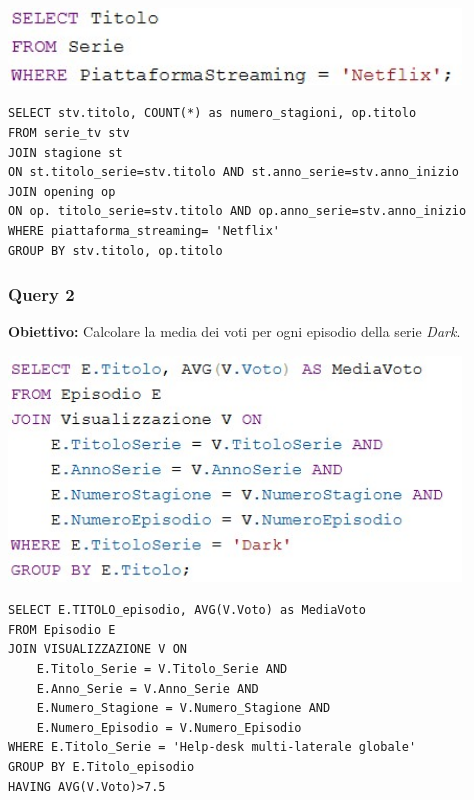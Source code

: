 \documentclass[12pt,a4paper]{article}
\begin{document}
\vspace{0.5cm}
\begin{center}
\includegraphics[width=0.9\textwidth]{Query1.jpg}
\end{center}


\begin{lstlisting}[caption={Esempio di query SQL}, label={lst:sql-example}]
SELECT stv.titolo, COUNT(*) as numero_stagioni, op.titolo
FROM serie_tv stv
JOIN stagione st
ON st.titolo_serie=stv.titolo AND st.anno_serie=stv.anno_inizio
JOIN opening op
ON op. titolo_serie=stv.titolo AND op.anno_serie=stv.anno_inizio
WHERE piattaforma_streaming= 'Netflix'
GROUP BY stv.titolo, op.titolo
\end{lstlisting}

\vspace{1cm}

\subsubsection*{Query 2 }
\textbf{Obiettivo:} Calcolare la media dei voti per ogni episodio della serie \textit{Dark}.

\vspace{0.5cm}
\begin{center}
\includegraphics[width=0.9\textwidth]{Query2.jpg}
\end{center}

\begin{lstlisting}[caption={Esempio di query SQL}, label={lst:sql-example}]
SELECT E.TITOLO_episodio, AVG(V.Voto) as MediaVoto
FROM Episodio E
JOIN VISUALIZZAZIONE V ON
	E.Titolo_Serie = V.Titolo_Serie AND
	E.Anno_Serie = V.Anno_Serie AND
	E.Numero_Stagione = V.Numero_Stagione AND
	E.Numero_Episodio = V.Numero_Episodio
WHERE E.Titolo_Serie = 'Help-desk multi-laterale globale'
GROUP BY E.Titolo_episodio
HAVING AVG(V.Voto)>7.5
\end{lstlisting}
\end{document}
